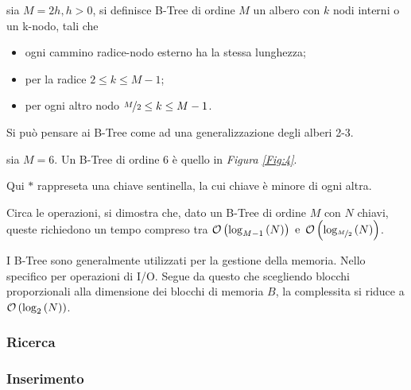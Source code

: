 \documentclass{subfiles}
\begin{document}
\begin{Definition*}
    sia \(M = 2h, h > 0\), si definisce B-Tree di ordine \(M\) un albero con \(k\) nodi interni o un k-nodo,
    tali che
    \begin{itemize}
        \item ogni cammino radice-nodo esterno ha la stessa lunghezza;
        \item per la radice \(2 \le k \le M -1\);
        \item per ogni altro nodo \(\nicefrac{M}{2} \le k \le M -1\).
    \end{itemize}

    \begin{Remark*}
        Si può pensare ai B-Tree come ad una generalizzazione degli alberi 2-3.
    \end{Remark*}
\end{Definition*}
\begin{Example*}
    sia \(M = 6\). Un B-Tree di ordine 6 è quello in \emph{Figura \ref{Fig:4}}.
    \begin{MarginNote}
        Qui \(*\) rappreseta una chiave sentinella, la cui chiave è minore di ogni altra.
    \end{MarginNote}
    
\end{Example*}

Circa le operazioni, si dimostra che, dato un B-Tree di ordine \(M\) con \(N\) chiavi,
queste richiedono un tempo compreso tra \(\OrderOf{\Log{N}[M - 1]} \text{e} \OrderOf{\Log{N}[\nicefrac{M}{2}]}\).

\begin{Remark*}
    I B-Tree sono generalmente utilizzati per la gestione della memoria. Nello specifico per operazioni di I/O.
    Segue da questo che scegliendo blocchi proporzionali alla dimensione dei blocchi di memoria \(B\),
    la complessita si riduce a \(\OrderOf{\Log{N}[2]}\).
\end{Remark*}

\subsubsection{Ricerca}


\subsubsection{Inserimento}

\end{document}
